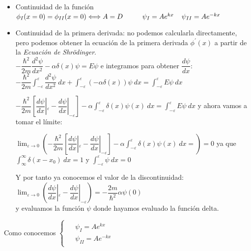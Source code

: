 \documentclass{report}
\begin{document}
    \begin{itemize}
      \item Continuidad de la función $\phi_I(x=0)=\phi_{II}(x=0)\Longleftrightarrow
            A=D\hspace{1cm}\psi_I=Ae^{kx}\hspace{0.4cm}\psi_{II}=Ae^{-kx}$
      \item Continuidad de la primera derivada: no podemos calcularla directamente,
            pero podemos obtener la ecuación de la primera derivada $\phi^\prime (x)$
            a partir de la \textit{Ecuación de Shrödinger}.\\
            $-\dfrac{\hbar^2}{2m}\dfrac{d^2\psi}{dx^2}-\alpha\delta(x)\psi=E\psi$ e 
            integramos para obtener $\dfrac{d\psi}{dx}$:
            $-\dfrac{\hbar^2}{2m}\displaystyle\int_{-\varepsilon}^{\varepsilon}\dfrac{d^2\psi}{dx^2}\ dx
            +\displaystyle\int_{-\varepsilon}^{\varepsilon}(-\alpha\delta(x))\psi\ dx=
            \displaystyle\int_{-\varepsilon}^{\varepsilon}E\psi\ dx$
            
            $-\dfrac{\hbar^2}{2m}\left[\dfrac{d\psi}{dx}|_\varepsilon-\dfrac{d\psi}{dx}|_{-\varepsilon}\right]
            -\alpha\displaystyle\int_{-\varepsilon}^{\varepsilon}\delta(x)\psi(x)\ dx=
            \displaystyle\int_{-\varepsilon}^{\varepsilon}E\psi\ dx$ y ahora vamos a tomar
            el límite:

            $\displaystyle\lim_{\varepsilon\rightarrow 0}\left(-\dfrac{\hbar^2}{2m}\left[\dfrac{d\psi}{dx}|_\varepsilon-
            \dfrac{d\psi}{dx}|_{-\varepsilon}\right]-\alpha\displaystyle\int_{-\varepsilon}^{\varepsilon}
            \delta(x)\psi(x)\ dx=\right)=0$ ya que $\displaystyle\int_{\infty}^{\infty}\delta(x-x_0)\ dx=1$ y 
            $\displaystyle\int_{-\varepsilon}^{\varepsilon}\psi\ dx=0$ 

            Y por tanto ya conocemos el valor de la discontinuidad:
            $\displaystyle\lim_{\varepsilon\rightarrow 0}\left(\dfrac{d\psi}{dx}|_\varepsilon-
            \dfrac{d\psi}{dx}|_{-\varepsilon}\right)=-\dfrac{2m}{\hbar^2}\alpha\psi(0)$ \\
            y evaluamos la función $\psi$ donde hayamos evaluado la función delta.
    \end{itemize}
    Como conocemos 
            $\begin{cases}
              \begin{aligned}
                &\psi_{I}=Ae^{kx}\\
                &\psi_{II}=Ae^{-kx}
              \end{aligned}
            \end{cases}$\hspace{-0.3cm}
\end{document}
